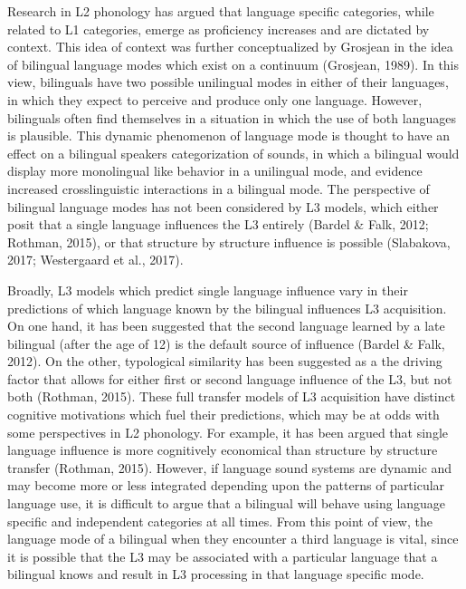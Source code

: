 \documentclass[
  man,floatsintext]{apa6}
\begin{document}
Research in L2 phonology has argued that language specific categories, while related to L1 categories, emerge as proficiency increases and are dictated by context.
This idea of context was further conceptualized by Grosjean in the idea of bilingual language modes which exist on a continuum (Grosjean, 1989).
In this view, bilinguals have two possible unilingual modes in either of their languages, in which they expect to perceive and produce only one language.
However, bilinguals often find themselves in a situation in which the use of both languages is plausible.
This dynamic phenomenon of language mode is thought to have an effect on a bilingual speakers categorization of sounds, in which a bilingual would display more monolingual like behavior in a unilingual mode, and evidence increased crosslinguistic interactions in a bilingual mode.
The perspective of bilingual language modes has not been considered by L3 models, which either posit that a single language influences the L3 entirely (Bardel \& Falk, 2012; Rothman, 2015), or that structure by structure influence is possible (Slabakova, 2017; Westergaard et al., 2017).

Broadly, L3 models which predict single language influence vary in their predictions of which language known by the bilingual influences L3 acquisition. On one hand, it has been suggested that the second language learned by a late bilingual (after the age of 12) is the default source of influence (Bardel \& Falk, 2012).
On the other, typological similarity has been suggested as a the driving factor that allows for either first or second language influence of the L3, but not both (Rothman, 2015).
These full transfer models of L3 acquisition have distinct cognitive motivations which fuel their predictions, which may be at odds with some perspectives in L2 phonology.
For example, it has been argued that single language influence is more cognitively economical than structure by structure transfer (Rothman, 2015).
However, if language sound systems are dynamic and may become more or less integrated depending upon the patterns of particular language use, it is difficult to argue that a bilingual will behave using language specific and independent categories at all times.
From this point of view, the language mode of a bilingual when they encounter a third language is vital, since it is possible that the L3 may be associated with a particular language that a bilingual knows and result in L3 processing in that language specific mode.
\end{document}
